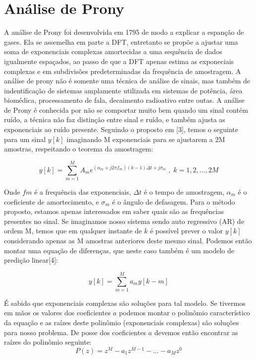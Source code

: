 \documentclass[a4paper, 12pt]{book}
\begin{document}
\section{Análise de Prony}
A análise de Prony foi desenvolvida em 1795 de modo a explicar a espanção de gases. Ela se assemelha em parte a DFT, entretanto se propõe a ajustar uma soma de exponenciais complexas amortecidas a uma sequência de dados igualmente espaçados, ao passo de que a DFT apenas estima as exponeciais complexas e em subdivisões predeterminadas da frequência de amostragem. A análise de prony não é somente uma técnica de análise de sinais, mas também de indentificação de sistemas amplamente utilizada em sistemas de potência, área biomédica, processamento de fala, decaimento radioativo entre outas. 
A análise de Prony é conhecida por não se comportar muito bem quando um sinal contém ruído, a técnica não faz distinção entre sinal e ruído, e também ajusta as exponenciais ao ruído presente.
Seguindo o proposto em [3], temos o seguinte para um sinal $y[k]$ imaginando M exponenciais para se ajustarem a 2M amostras, respeitando o teorema da amostragem:

\Large
\begin{equation}
y[k]=\sum_{m=1}^{M}A_me^{(\alpha_m+j2\pi f_m)(k-1)\Delta t +j\sigma_m}\;,\;k=1,2,...,2M
\end{equation}
\normalsize

\indent Onde $fm$ é a frequência das exponenciais, $\Delta t$ é o tempo de amostragem, $\alpha _m$ é o coeficiente de amortecimento, e $\sigma _m$ é o ângulo de defasagem. Para o método proposto, estamos apenas interessados em saber quais são as frequências presentes no sinal. Se imaginamos nosso sistema sendo auto regressivo (AR) de ordem M, temos que em qualquer instante de $k$ é possível prever o valor $y[k]$ considerando apenas as M amostras anteriores deste mesmo sinal. Podemos então montar uma equação de diferenças, que neste caso também é um modelo de predição linear[4]:

\begin{equation}
y[k]=\sum_{m=1}^{M}a_m y[k-m]
\end{equation}

É sabido que exponenciais complexas são soluções para tal modelo. Se tivermos em mãos os valores dos coeficientes $a$ podemos montar o polinômio característico da equação e as raízes deste polinômio (exponenciais complexas) são soluções para nosso problema. De posse dos coeficientes $a$ devemos então encontrar as raízes do polinômio seguinte:
\begin{equation}
P(z)=z^M-a_1z^{M-1}-...-a_Mz^0
\end{equation}
\end{document}
